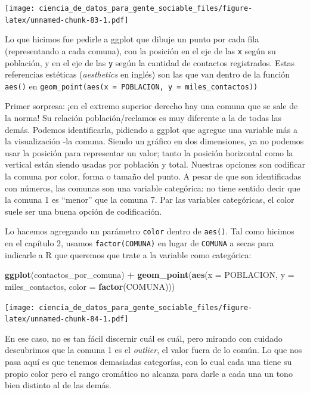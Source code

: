 \documentclass[]{book}
\newenvironment{Shaded}{\begin{snugshade}}{\end{snugshade}}
\newcommand{\KeywordTok}[1]{\textcolor[rgb]{0.13,0.29,0.53}{\textbf{#1}}}
\newcommand{\DataTypeTok}[1]{\textcolor[rgb]{0.13,0.29,0.53}{#1}}
\newcommand{\StringTok}[1]{\textcolor[rgb]{0.31,0.60,0.02}{#1}}
\newcommand{\OperatorTok}[1]{\textcolor[rgb]{0.81,0.36,0.00}{\textbf{#1}}}
\newcommand{\NormalTok}[1]{#1}
\begin{document}
\texttt{[image: ciencia\_de\_datos\_para\_gente\_sociable\_files/figure-latex/unnamed-chunk-83-1.pdf]}

Lo que hicimos fue pedirle a ggplot que dibuje un punto por cada fila
(representando a cada comuna), con la posición en el eje de las
\texttt{x} según su población, y en el eje de las \texttt{y} según la
cantidad de contactos registrados. Estas referencias estéticas
(\emph{aesthetics} en inglés) son las que van dentro de la función
\texttt{aes()} en
\texttt{geom\_point(aes(x\ =\ POBLACION,\ y\ =\ miles\_contactos))}

Primer sorpresa: ¡en el extremo superior derecho hay una comuna que se
sale de la norma! Su relación población/reclamos es muy diferente a la
de todas las demás. Podemos identificarla, pidiendo a ggplot que agregue
una variable más a la visualización -la comuna. Siendo un gráfico en dos
dimensiones, ya no podemos usar la posición para representar un valor;
tanto la posición horizontal como la vertical están siendo usadas por
población y total. Nuestras opciones son codificar la comuna por color,
forma o tamaño del punto. A pesar de que son identificadas con números,
las comunas son una variable categórica: no tiene sentido decir que la
comuna 1 es ``menor'' que la comuna 7. Par las variables categóricas, el
color suele ser una buena opción de codificación.

Lo hacemos agregando un parámetro \texttt{color} dentro de
\texttt{aes()}. Tal como hicimos en el capítulo 2, usamos
\texttt{factor(COMUNA)} en lugar de \texttt{COMUNA} a secas para
indicarle a R que queremos que trate a la variable como categórica:

\begin{Shaded}
\begin{Highlighting}[]
\KeywordTok{ggplot}\NormalTok{(contactos_por_comuna) }\OperatorTok{+}\StringTok{ }
\StringTok{    }\KeywordTok{geom_point}\NormalTok{(}\KeywordTok{aes}\NormalTok{(}\DataTypeTok{x =}\NormalTok{ POBLACION, }\DataTypeTok{y =}\NormalTok{ miles_contactos, }\DataTypeTok{color =} \KeywordTok{factor}\NormalTok{(COMUNA)))}
\end{Highlighting}
\end{Shaded}

\texttt{[image: ciencia\_de\_datos\_para\_gente\_sociable\_files/figure-latex/unnamed-chunk-84-1.pdf]}

En ese caso, no es tan fácil discernir cuál es cuál, pero mirando con
cuidado descubrimos que la comuna 1 es el \emph{outlier}, el valor fuera
de lo común. Lo que nos pasa aquí es que tenemos demasiadas categorías,
con lo cual cada una tiene su propio color pero el rango cromático no
alcanza para darle a cada una un tono bien distinto al de las demás.
\end{document}
